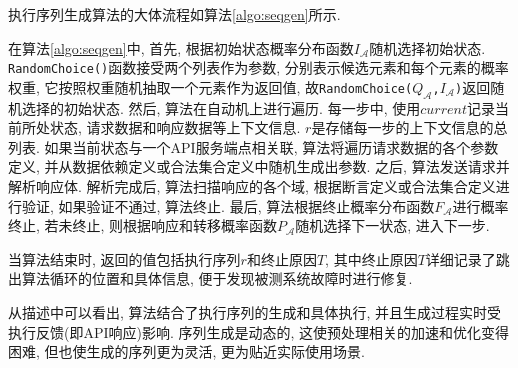             执行序列生成算法的大体流程如算法\ref{algo:seqgen}所示.
            
            在算法\ref{algo:seqgen}中, 首先, 根据初始状态概率分布函数$I_{\mathcal{A}}$随机选择初始状态. \texttt{RandomChoice()}函数接受两个列表作为参数, 分别表示候选元素和每个元素的概率权重, 它按照权重随机抽取一个元素作为返回值, 故\texttt{RandomChoice(}$Q_{\mathcal{A}}$\texttt{,}$I_{\mathcal{A}}$\texttt{)}返回随机选择的初始状态. 然后, 算法在自动机上进行遍历. 每一步中, 使用$current$记录当前所处状态, 请求数据和响应数据等上下文信息. $r$是存储每一步的上下文信息的总列表. 如果当前状态与一个API服务端点相关联, 算法将遍历请求数据的各个参数定义, 并从数据依赖定义或合法集合定义中随机生成出参数. 之后, 算法发送请求并解析响应体. 解析完成后, 算法扫描响应的各个域, 根据断言定义或合法集合定义进行验证, 如果验证不通过, 算法终止. 最后, 算法根据终止概率分布函数$F_{\mathcal{A}}$进行概率终止, 若未终止, 则根据响应和转移概率函数$P_{\mathcal{A}}$随机选择下一状态, 进入下一步.
            
            当算法结束时, 返回的值包括执行序列$r$和终止原因$T$, 其中终止原因$T$详细记录了跳出算法循环的位置和具体信息, 便于发现被测系统故障时进行修复.
            
            从描述中可以看出, 算法结合了执行序列的生成和具体执行, 并且生成过程实时受执行反馈(即API响应)影响. 序列生成是动态的, 这使预处理相关的加速和优化变得困难, 但也使生成的序列更为灵活, 更为贴近实际使用场景.
            
